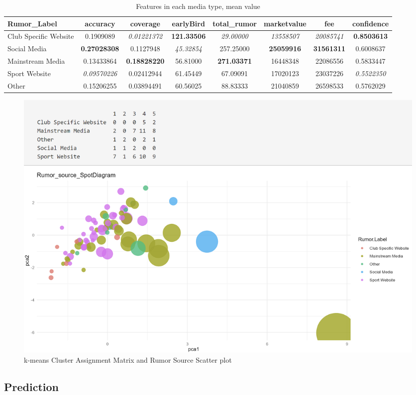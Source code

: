 \begin{table}[htbp]
    \centering
    \caption{Features in each media type, mean value}
    \label{tab:rumor_feature}
    \begin{tabular}{lccccccc} %
        \toprule
        Rumor\_Label & accuracy & coverage & earlyBird & total\_rumor & marketvalue & fee & confidence \\
        \midrule
        Club Specific Website & 0.1909089 & \textit{0.01221372} & \textbf{121.33506} & \textit{29.00000} & \textit{13558507} & \textit{20085741} & \textbf{0.8503613} \\
        Social Media &\textbf{0.27028308} & 0.1127948 & \textit{45.32854} & 257.25000 & \textbf{25059916} & \textbf{31561311} & 0.6008637 \\
        Mainstream Media & 0.13433864 & \textbf{0.18828220} & 56.81000 & \textbf{271.03371} & 16448348 & 22086556 & 0.5833447 \\
        Sport Website &\textit{ 0.09570226} & 0.02412944 & 61.45449 & 67.09091 & 17020123 & 23037226 & \textit{0.5522350} \\
        Other & 0.15206255 & 0.03894491 & 60.56025 & 88.83333 & 21040859 & 26598533 & 0.5762029 \\
        \bottomrule
    \end{tabular}
\end{table}
\begin{figure}[ht]
    \centering
    \includegraphics[width=.8\textwidth]{figs/shiny_result.png}
    \caption{
        k-means Cluster Assignment Matrix and Rumor Source Scatter plot
    }\label{fig:shiny_result}
\end{figure}

\subsection{Prediction}

